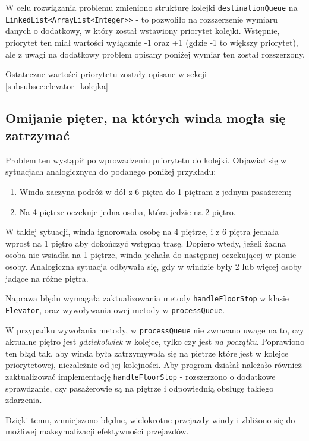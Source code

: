 \documentclass[12pt, a4paper]{article}
\begin{document}
W celu rozwiązania problemu zmieniono strukturę kolejki \texttt{destinationQueue} na \texttt{LinkedList<ArrayList<Integer>>} - to pozwoliło na rozszerzenie wymiaru danych
o dodatkowy, w który został wstawiony priorytet kolejki. Wstępnie, priorytet ten miał wartości wyłącznie -1 oraz +1 (gdzie -1 to większy priorytet), ale z uwagi na dodatkowy
problem opisany poniżej wymiar ten został rozszerzony. 

Ostateczne wartości priorytetu zostały opisane w sekcji \ref{subsubsec:elevator_kolejka}

\subsection{Omijanie pięter, na których winda mogła się zatrzymać}

Problem ten wystąpił po wprowadzeniu priorytetu do kolejki. Objawiał się w sytuacjach analogicznych do podanego poniżej przykładu:

\begin{enumerate}
  \item Winda zaczyna podróż w dół z 6 piętra do 1 piętram z jednym pasażerem;
  \item Na 4 piętrze oczekuje jedna osoba, która jedzie na 2 piętro.
\end{enumerate} 

W takiej sytuacji, winda ignorowała osobę na 4 piętrze, i z 6 piętra jechała wprost na 1 piętro aby dokończyć wstępną trasę. Dopiero wtedy, jeżeli żadna osoba nie wsiadła na 1 
piętrze, winda jechała do następnej oczekującej w pionie osoby. Analogiczna sytuacja odbywała się, gdy w windzie były 2 lub więcej osoby jadące na różne piętra. 

Naprawa błędu wymagała zaktualizowania metody \texttt{handleFloorStop} w klasie \texttt{Elevator}, oraz wywoływania owej metody w \texttt{processQueue}.

W przypadku wywołania metody, w \texttt{processQueue} nie zwracano uwage na to, czy aktualne piętro jest \emph{gdziekolwiek} w kolejce, tylko czy jest \emph{na początku}.
Poprawiono ten błąd tak, aby winda była zatrzymywała się na pietrze które jest w kolejce priorytetowej, niezależnie od jej kolejności. Aby program działał należało również 
zaktualizować implementację \texttt{handleFloorStop} - rozszerzono o dodatkowe sprawdzanie, czy pasażerowie są na piętrze i odpowiednią obsługę takiego zdarzenia.

Dzięki temu, zmniejszono błędne, wielokrotne przejazdy windy i zbliżono się do możliwej maksymalizacji efektywności przejazdów.
\end{document}
